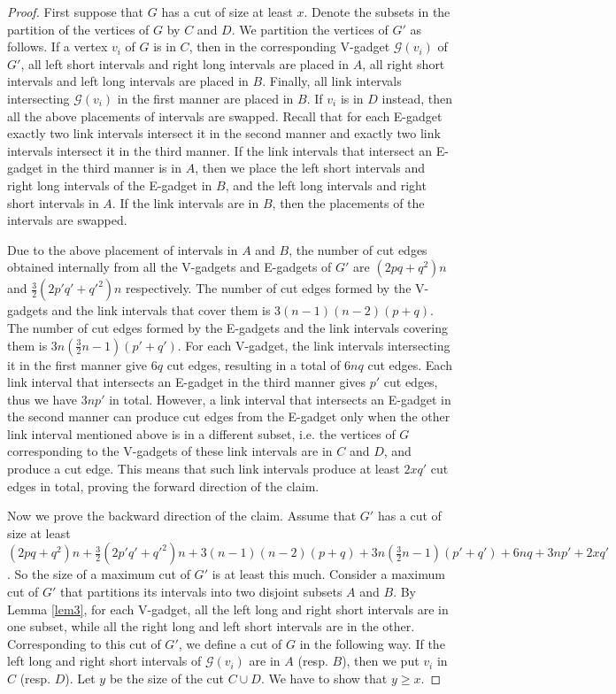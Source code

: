 \documentclass[11pt]{article}
\begin{document}
\begin{proof}
First suppose that $G$ has a cut of size at least $x$. Denote the subsets in the partition of the vertices of $G$ by $C$ and $D$. We partition the vertices of $G'$ as follows. If a vertex $v_i$ of $G$ is in $C$, then in the corresponding V-gadget $\mathcal{G}(v_i)$ of $G'$, all left short intervals and right long intervals are placed in $A$, all right short intervals and left long intervals are placed in $B$. Finally, all link intervals intersecting $\mathcal{G}(v_i)$ in the first manner are placed in $B$. If $v_i$ is in $D$ instead, then all the above placements of intervals are swapped. Recall that for each E-gadget exactly two link intervals intersect it in the second manner and exactly two link intervals intersect it in the third manner. If the link intervals that intersect an E-gadget in the third manner is in $A$, then we place the left short intervals and right long intervals of the E-gadget in $B$, and the left long intervals and right short intervals in $A$. If the link intervals are in $B$, then the placements of the intervals are swapped. 

Due to the above placement of intervals in $A$ and $B$, the number of cut edges obtained internally from all the V-gadgets and E-gadgets of $G'$ are $(2pq + q^2)n$ and $\frac{3}{2}(2p'q' + q'^2)n$ respectively. The number of cut edges formed by the V-gadgets and the link intervals that cover them is $3(n-1)(n-2)(p+q)$. The number of cut edges formed by the E-gadgets and the link intervals covering them is $3n(\frac{3}{2}n-1) (p'+q')$. For each V-gadget, the link intervals intersecting it in the first manner give $6q$ cut edges, resulting in a total of $6nq$ cut edges. Each link interval that intersects an E-gadget in the third manner gives $p'$ cut edges, thus we have $3np'$ in total. However, a link interval that intersects an E-gadget in the second manner can produce cut edges from the E-gadget only when the other link interval mentioned above is in a different subset, i.e. the vertices of $G$ corresponding to the V-gadgets of these  link intervals are in $C$ and $D$, and produce a cut edge. This means that such link intervals produce at least $2xq'$ cut edges in total, proving the forward direction of the claim.

Now we prove the backward direction of the claim. Assume that $G'$ has a cut of size at least $(2pq + q^2)n +  \frac{3}{2}(2p'q' + q'^2)n +  3(n-1)(n-2)(p+q) + 3n(\frac{3}{2}n-1) (p'+q') + 6nq + 3np' + 2xq'$. So the size of a maximum cut of $G'$ is at least this much. Consider a maximum cut of $G'$ that partitions its intervals into two disjoint subsets $A$ and $B$. By Lemma \ref{lem3}, for each V-gadget, all the left long and right short intervals are in one subset, while all the right long and left short intervals are in the other. Corresponding to this cut of $G'$, we define a cut of $G$ in the following way. If the left long and right short intervals of  $\mathcal{G}(v_i)$ are in $A$ (resp. $B$), then we put $v_i$ in $C$ (resp. $D$). Let $y$ be the size of the cut $C \cup D$. We have to show that $y \geq x$.  


\end{proof}
\end{document}
